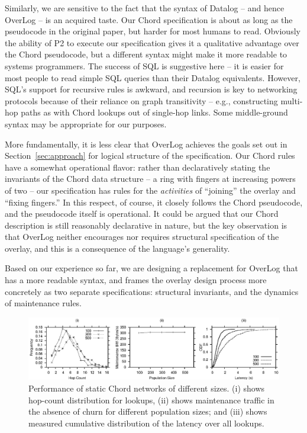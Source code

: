 \documentclass{sig-alt-full}
\def\Sys{P2\xspace}
\def\Lang{OverLog\xspace}
\begin{document}
Similarly, we are sensitive to the fact that the syntax of Datalog --
and hence \Lang{} -- is an acquired taste.  Our Chord specification is
about as long as the pseudocode in the original paper, but harder for
most humans to read.  Obviously the ability of \Sys to execute our
specification gives it a qualitative advantage over the Chord
pseudocode, but a different syntax might make it more readable to
systems programmers.  The success of SQL is suggestive here -- it is
easier for most people to read simple SQL queries than their Datalog
equivalents.  However, SQL's support for recursive rules is
awkward, and recursion is key to networking protocols because of their
reliance on graph transitivity -- e.g., constructing multi-hop paths
as with Chord lookups out of single-hop links.  Some middle-ground
syntax may be appropriate for our purposes.

More fundamentally, it is less clear that \Lang achieves
the goals set out in Section~\ref{sec:approach} for logical structure
of the specification.  Our Chord rules have a somewhat operational
flavor: rather than declaratively stating the 
invariants of the Chord data structure -- a ring with fingers at
increasing powers of two -- our specification has rules for the
\emph{activities} of ``joining'' the overlay and ``fixing fingers.''
In this respect, of course, it closely follows the Chord pseudocode,
and the pseudocode itself is operational.  
It could be argued that our Chord description is still reasonably
declarative in nature, but the key observation is that \Lang neither
encourages nor requires structural specification of the overlay, and
this is a consequence of the language's generality.  

Based on our experience so far, we are designing a
replacement for \Lang that has a more readable syntax, and
frames the overlay design process more concretely as two separate
specifications: structural invariants, and the dynamics of
maintenance rules.

\begin{figure}
\centerline{\includegraphics{results/newgraphs/nochurn/nochurn}}
\caption{Performance of static Chord networks of different sizes.
(i) shows hop-count distribution for lookups, (ii)
shows maintenance traffic in the absence of churn for
different population sizes; and (iii)
shows measured cumulative distribution of the latency over all lookups.}
\label{fig:static}
\end{figure}
\end{document}
